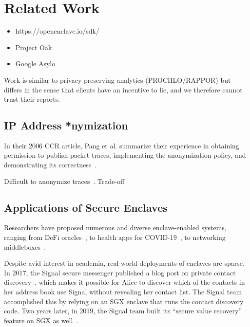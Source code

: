 \section{Related Work}
\label{sec:related-work}

\begin{itemize}
    \item https://openenclave.io/sdk/
    \item Project Oak
    \item Google Asylo
\end{itemize}

Work is similar to privacy-preserving analytics (PROCHLO/RAPPOR) but differs in the sense that clients have an incentive to lie, and we therefore cannot trust their reports.

\subsection{IP Address *nymization}


In their 2006 CCR article, Pang et al. summarize their experience in obtaining permission to publish packet traces, implementing the anonymization policy, and demonstrating its correctness~\cite{Pang06a}.

Difficult to anonymize traces~\cite{Burkhart10a}. Trade-off~\cite{Mohammady15a}

\subsection{Applications of Secure Enclaves}

Researchers have proposed numerous and diverse enclave-enabled systems, ranging from DeFi oracles~\cite{Zhang16a}, to health apps for COVID-19~\cite{Mailthody21a}, to networking middleboxes~\cite{Han17a}.

Despite avid interest in academia, real-world deployments of enclaves are sparse.  In 2017, the Signal secure messenger published a blog post on private contact discovery~\cite{Marlinspike17a}, which makes it possible for Alice to discover which of the contacts in her address book use Signal without revealing her contact list.  The Signal team accomplished this by relying on an SGX enclave that runs the contact discovery code.  Two years later, in 2019, the Signal team built its ``secure value recovery'' feature on SGX as well~\cite{Lund19a}.

